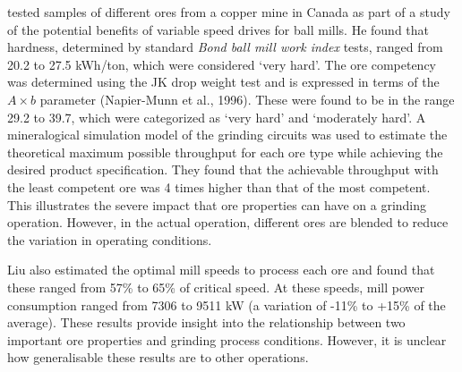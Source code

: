 \cite{liu_development_2018} tested samples of different ores from a copper mine in Canada as part of a study of the potential benefits of variable speed drives for ball mills. He found that hardness, determined by standard \textit{Bond ball mill work index} tests, ranged from 20.2 to 27.5 \gls{kWh}/ton, which were considered `very hard'. The ore competency was determined using the JK drop weight test and is expressed in terms of the $A\times{b}$ parameter (Napier-Munn et al., 1996). These were found to be in the range 29.2 to 39.7, which were categorized as `very hard' and `moderately hard'. A mineralogical simulation model of the grinding circuits was used to estimate the theoretical maximum possible throughput for each ore type while achieving the desired product specification. They found that the achievable throughput with the least competent ore was 4 times higher than that of the most competent. This illustrates the severe impact that ore properties can have on a grinding operation. However, in the actual operation, different ores are blended to reduce the variation in operating conditions.

Liu also estimated the optimal mill speeds to process each ore and found that these ranged from 57\% to 65\% of critical speed. At these speeds, mill power consumption ranged from 7306 to 9511 kW (a variation of -11\% to +15\% of the average). These results provide insight into the relationship between two important ore properties and grinding process conditions. However, it is unclear how generalisable these results are to other operations.

